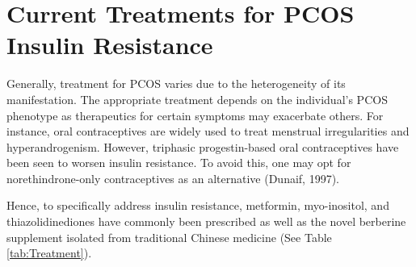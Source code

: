\section{Current Treatments for PCOS Insulin Resistance}

Generally, treatment for PCOS varies due to the heterogeneity of its manifestation. The appropriate treatment depends on the individual’s PCOS phenotype as therapeutics for certain symptoms may exacerbate others. For instance, oral contraceptives are widely used to treat menstrual irregularities and hyperandrogenism. However, triphasic progestin-based oral contraceptives have been seen to worsen insulin resistance. To avoid this, one may opt for norethindrone-only contraceptives as an alternative (Dunaif, 1997).  

Hence, to specifically address insulin resistance, metformin, myo-inositol, and thiazolidinediones have commonly been prescribed as well as the novel berberine supplement isolated from traditional Chinese medicine (See Table \ref{tab:Treatment}). 

